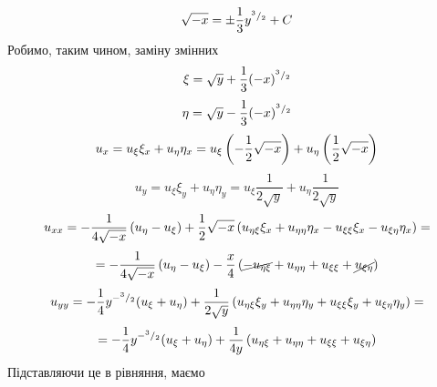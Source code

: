 \documentclass[12pt]{article} %
\begin{document}
\[\sqrt{-x}=\pm\frac{1}{3}y^{{^{3}/_{2}}}+C\]
Робимо, таким чином, заміну змінних
\[\xi=\sqrt{y}+\frac{1}{3}(-x)^{{^{3}/_{2}}}\]
\[\eta=\sqrt{y}-\frac{1}{3}(-x)^{{^{3}/_{2}}}\]
\[u_x=u_\xi\xi_x+u_\eta\eta_x=u_\xi\left(-\frac{1}{2}\sqrt{-x}\right)+u_\eta\left(\frac{1}{2}\sqrt{-x}\right)\]
\[u_y=u_\xi\xi_y+u_\eta\eta_y=u_\xi\frac{1}{2\sqrt{y}}+u_\eta\frac{1}{2\sqrt{y}}\]
\[u_{xx}=-\frac{1}{4\sqrt{-x}}\left(u_\eta-u_\xi\right)+\frac{1}{2}\sqrt{-x}\left(u_{\eta\xi}\xi_x+u_{\eta\eta}\eta_x-
u_{\xi\xi}\xi_x-u_{\xi\eta}\eta_x\right)=\]\[=-\frac{1}{4\sqrt{-x}}\left(u_\eta-u_\xi\right)-\frac{x}{4}\left(\cancel{-u_{\eta\xi}}
+u_{\eta\eta}+u_{\xi\xi}+\cancel{u_{\xi\eta}}\right)\]
\[u_{yy}=-\frac{1}{4}y^{-{^{3}/_{2}}}(u_\xi+u_\eta)+\frac{1}{2\sqrt{y}}
\left(u_{\eta\xi}\xi_y+u_{\eta\eta}\eta_y+u_{\xi\xi}\xi_y+u_{\xi\eta}\eta_y\right)=\]\[=-\frac{1}{4}y^{-{^{3}/_{2}}}(u_\xi+u_\eta)+\frac{1}{4{y}}
\left({u_{\eta\xi}}+u_{\eta\eta}+u_{\xi\xi}+{u_{\xi\eta}}\right)\]
Підставляючи це в рівняння, маємо
\end{document}
